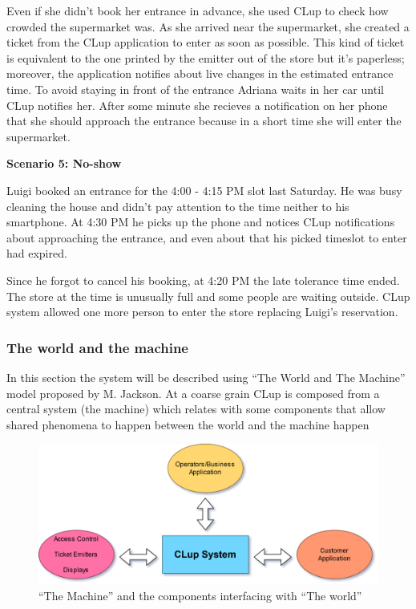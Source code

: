 \smallskip

Even if she didn't book her entrance in advance, she used CLup to check how crowded the supermarket was. As she arrived near the supermarket, she created a ticket from the CLup application to enter as soon as possible. This kind of ticket is equivalent to the one printed by the emitter out of the store but it's paperless; moreover, the application notifies about live changes in the estimated entrance time. To avoid staying in front of the entrance Adriana waits in her car until CLup notifies her.
After some minute she recieves a notification on her phone that she should approach the entrance because in a short time she will enter the supermarket.

\medskip

\textbf{Scenario 5: No-show}

Luigi booked an entrance for the 4:00 - 4:15 PM slot last Saturday. He was busy cleaning the house and didn't pay attention to the time neither to his smartphone. At 4:30 PM he picks up the phone and notices CLup notifications about approaching the entrance, and even about that his picked timeslot to enter had expired.

\smallskip

Since he forgot to cancel his booking, at 4:20 PM the late tolerance time ended. The store at the time is unusually full and some people are waiting outside. CLup system allowed one more person to enter the store replacing Luigi's reservation.

\vfill
\pagebreak


\subsubsection{The world and the machine}
In this section the system will be described using ``The World and The Machine'' model proposed by M. Jackson.
At a coarse grain CLup is composed from a central system (the machine) which relates with some components that allow shared phenomena to happen between the world and the machine happen

\begin{figure}[H]
    \includegraphics[width=\textwidth]{Images/system2.png}
    \caption{\label{fig:Coarse_Grain_System}``The Machine'' and the components interfacing with ``The world''}
\end{figure}

